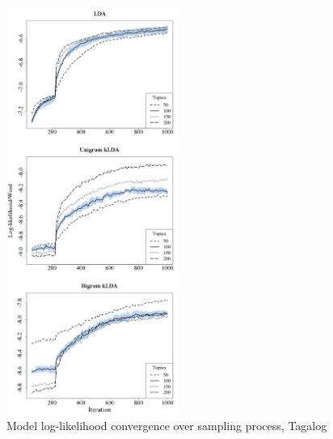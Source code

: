 \begin{figure}[t]
\begin{center}
\includegraphics[width=0.5\textwidth]{graphs/ch6/ll/tagalog-lda-ll.png}
\end{center}
\caption[Log-Likelihood convergence, Tagalog]{Model log-likelihood convergence over sampling process, Tagalog\label{figC:llTagalog}}
\end{figure}


